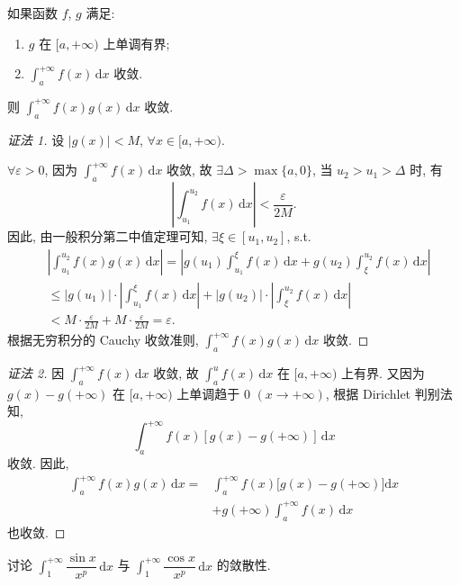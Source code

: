 \begin{theorem}\label{thm:6.5.5}
如果函数 $f$, $g$ 满足:
\begin{enumerate}[label=(\arabic*)]
\item $g$ 在 $[a,+\infty)$ 上单调有界;
\item $\int_{a}^{+\infty}f(x)\,\mathrm{d}x$ 收敛.
\end{enumerate}
则 $\int_{a}^{+\infty}f(x)g(x)\,\mathrm{d}x$ 收敛.
\end{theorem}

\begin{proof}[证法 1]
设 $|g(x)|<M$, $\forall x\in[a,+\infty)$.

$\forall\varepsilon>0$, 因为 $\int_{a}^{+\infty}f(x)\,\mathrm{d}x$ 收敛, 故 $\exists\Delta>\max\{a,0\}$, 当 $u_{2}>u_{1}>\Delta$ 时, 有
\[
\left|\int_{u_{1}}^{u_{2}}f(x)\,\mathrm{d}x\right|<\frac{\varepsilon}{2M}.
\]
因此, 由一般积分第二中值定理可知, $\exists\xi\in[u_{1},u_{2}]$, s.t.
\begin{align*}
&\left|\int_{u_{1}}^{u_{2}}f(x)g(x)\,\mathrm{d}x\right|=\left|g(u_{1})\int_{u_{1}}^{\xi}f(x)\,\mathrm{d}x+g(u_{2})\int_{\xi}^{u_{2}}f(x)\,\mathrm{d}x\right|\\
&\leqslant\left|g(u_{1})\right|\cdot\left|\int_{u_{1}}^{\xi}f(x)\,\mathrm{d}x\right|+\left|g(u_{2})\right|\cdot\left|\int_{\xi}^{u_{2}}f(x)\,\mathrm{d}x\right|\\
&<M\cdot\frac{\varepsilon}{2M}+M\cdot\frac{\varepsilon}{2M}=\varepsilon.
\end{align*}
根据无穷积分的 Cauchy 收敛准则, $\int_{a}^{+\infty}f(x)g(x)\,\mathrm{d}x$ 收敛.
\end{proof}

\begin{proof}[证法 2]
因 $\int_{a}^{+\infty}f(x)\,\mathrm{d}x$ 收敛, 故 $\int_{a}^{u}f(x)\,\mathrm{d}x$ 在 $[a,+\infty)$ 上有界. 又因为 $g(x)-g(+\infty)$ 在 $[a,+\infty)$ 上单调趋于 $0$ $(x\to+\infty)$, 根据 Dirichlet 判别法知,
\[
\int_{a}^{+\infty}f(x)[g(x)-g(+\infty)]\,\mathrm{d}x
\]
收敛. 因此,
\begin{align*}
\int_{a}^{+\infty}f(x)g(x)\,\mathrm{d}x=&\int_{a}^{+\infty}f(x)\big[g(x)-g(+\infty)\big]\mathrm{d}x\\
&+g(+\infty)\int_{a}^{+\infty}f(x)\,\mathrm{d}x
\end{align*}
也收敛.
\end{proof}

\begin{example}\label{ex:6.5.12}
讨论 $\int_{1}^{+\infty}\dfrac{\sin x}{x^{p}}\,\mathrm{d}x$ 与 $\int_{1}^{+\infty}\dfrac{\cos x}{x^{p}}\,\mathrm{d}x$ 的敛散性.
\end{example}


